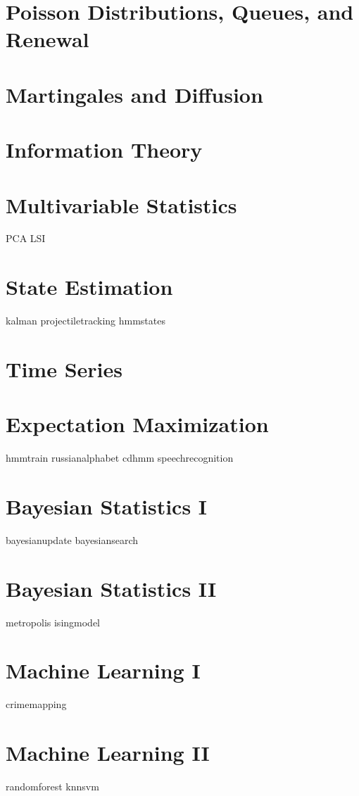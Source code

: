 \documentclass[nociteref]{newsiambook}
\begin{document}
\part{Poisson Distributions, Queues, and Renewal}

\part{Martingales and Diffusion}

\part{Information Theory}

\part{Multivariable Statistics}
{PCA}
{LSI}

\part{State Estimation}
{kalman}
{projectiletracking}
{hmmstates}

\part{Time Series}

\part{Expectation Maximization}
{hmmtrain}
{russianalphabet}
{cdhmm}
{speechrecognition}

\part{Bayesian Statistics I}
{bayesianupdate}
{bayesiansearch}

\part{Bayesian Statistics II}
{metropolis}
{isingmodel}

\part{Machine Learning I}



{crimemapping}

\part{Machine Learning II}
{randomforest}
{knnsvm}
\end{document}
